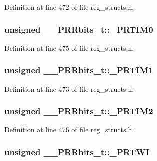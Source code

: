 Definition at line 472 of file reg\+\_\+structs.\+h.

\hypertarget{union_____p_r_rbits__t_a5c8145bfb802fe08785ee6d0248aaedf}{
\subsubsection[{\+\_\+\+P\+R\+T\+I\+M0}]{\setlength{\rightskip}{0pt plus 5cm}unsigned \+\_\+\+\_\+\+P\+R\+Rbits\+\_\+t\+::\+\_\+\+P\+R\+T\+I\+M0}}\label{union_____p_r_rbits__t_a5c8145bfb802fe08785ee6d0248aaedf}


Definition at line 475 of file reg\+\_\+structs.\+h.

\hypertarget{union_____p_r_rbits__t_a63bde66c276303b4be4f501fa9da4852}{
\subsubsection[{\+\_\+\+P\+R\+T\+I\+M1}]{\setlength{\rightskip}{0pt plus 5cm}unsigned \+\_\+\+\_\+\+P\+R\+Rbits\+\_\+t\+::\+\_\+\+P\+R\+T\+I\+M1}}\label{union_____p_r_rbits__t_a63bde66c276303b4be4f501fa9da4852}


Definition at line 473 of file reg\+\_\+structs.\+h.

\hypertarget{union_____p_r_rbits__t_a2da945cdab01b8eeac81deb02c706a44}{
\subsubsection[{\+\_\+\+P\+R\+T\+I\+M2}]{\setlength{\rightskip}{0pt plus 5cm}unsigned \+\_\+\+\_\+\+P\+R\+Rbits\+\_\+t\+::\+\_\+\+P\+R\+T\+I\+M2}}\label{union_____p_r_rbits__t_a2da945cdab01b8eeac81deb02c706a44}


Definition at line 476 of file reg\+\_\+structs.\+h.

\hypertarget{union_____p_r_rbits__t_a7c7dc9f58b68b79e44a5a318435fe3fb}{
\subsubsection[{\+\_\+\+P\+R\+T\+W\+I}]{\setlength{\rightskip}{0pt plus 5cm}unsigned \+\_\+\+\_\+\+P\+R\+Rbits\+\_\+t\+::\+\_\+\+P\+R\+T\+W\+I}}\label{union_____p_r_rbits__t_a7c7dc9f58b68b79e44a5a318435fe3fb}


